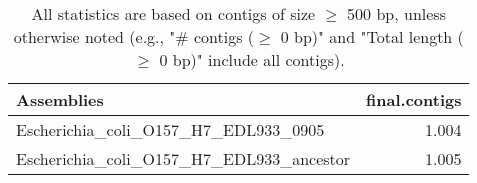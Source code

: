 \documentclass[12pt,a4paper]{article}
\begin{document}
\begin{table}[ht]
\begin{center}
\caption{All statistics are based on contigs of size $\geq$ 500 bp, unless otherwise noted (e.g., "\# contigs ($\geq$ 0 bp)" and "Total length ($\geq$ 0 bp)" include all contigs).}
\begin{tabular}{|l*{1}{|r}|}
\hline
Assemblies & final.contigs \\ \hline
Escherichia\_coli\_O157\_H7\_EDL933\_0905 & 1.004 \\ \hline
Escherichia\_coli\_O157\_H7\_EDL933\_ancestor & 1.005 \\ \hline
\end{tabular}
\end{center}
\end{table}
\end{document}
